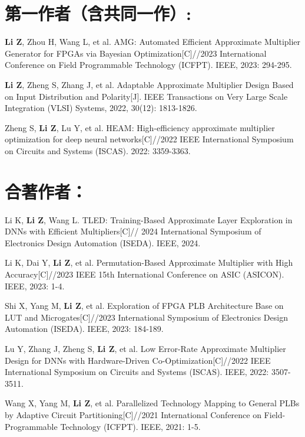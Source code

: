 {\section*{第一作者（含共同一作）:}
\begin{enumerate}[label={[\arabic*]}]
  \item \textbf{Li Z}, Zhou H, Wang L, et al. AMG: Automated Efficient Approximate Multiplier Generator for FPGAs via Bayesian Optimization[C]//2023 International Conference on Field Programmable Technology (ICFPT). IEEE, 2023: 294-295.
  \item \textbf{Li Z}, Zheng S, Zhang J, et al. Adaptable Approximate Multiplier Design Based on Input Distribution and Polarity[J]. IEEE Transactions on Very Large Scale Integration (VLSI) Systems, 2022, 30(12): 1813-1826.
  \item Zheng S, \textbf{Li Z}, Lu Y, et al. HEAM: High-efficiency approximate multiplier optimization for deep neural networks[C]//2022 IEEE International Symposium on Circuits and Systems (ISCAS). 2022: 3359-3363.
\end{enumerate}

\vspace{5pt}
\section*{合著作者：}
\begin{enumerate}[label={[\arabic*]}]
  \item Li K, \textbf{Li Z}, Wang L. TLED: Training-Based Approximate Layer Exploration in DNNs with Efficient Multipliers[C]// 2024 International Symposium of Electronics Design Automation (ISEDA). IEEE, 2024.
  \item Li K, Dai Y, \textbf{Li Z}, et al. Permutation-Based Approximate Multiplier with High Accuracy[C]//2023 IEEE 15th International Conference on ASIC (ASICON). IEEE, 2023: 1-4.
  \item Shi X, Yang M, \textbf{Li Z}, et al. Exploration of FPGA PLB Architecture Base on LUT and Microgates[C]//2023 International Symposium of Electronics Design Automation (ISEDA). IEEE, 2023: 184-189.
  \item Lu Y, Zhang J, Zheng S, \textbf{Li Z}, et al. Low Error-Rate Approximate Multiplier Design for DNNs with Hardware-Driven Co-Optimization[C]//2022 IEEE International Symposium on Circuits and Systems (ISCAS). IEEE, 2022: 3507-3511.
  \item Wang X, Yang M, \textbf{Li Z}, et al. Parallelized Technology Mapping to General PLBs by Adaptive Circuit Partitioning[C]//2021 International Conference on Field-Programmable Technology (ICFPT). IEEE, 2021: 1-5.
\end{enumerate}

}